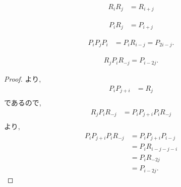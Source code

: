 \begin{lemma}
  \begin{align*}
    R_i R_j&= R_{i+j}
  \end{align*}
\end{lemma}

\begin{cor}
  \label{lem:i2m:fomula:prp}
  \begin{align*}
    P_i R_j&= P_{i+j}
  \end{align*}
\end{cor}

\begin{cor}
  \label{lem:i2m:formula:conjP}
  \begin{align*}
    P_i P_j P_i&= P_iR_{i-j}=P_{2i-j}.
  \end{align*}
\end{cor}

\begin{cor}
  \label{lem:i2m:formula:conjR}
  \begin{align*}
    R_{j}P_iR_{-j}=P_{i-2j}.
  \end{align*}
\end{cor}
\begin{proof}
  より,
  \begin{align*}
    P_{i}P_{j+i}&=R_{j}\\
  \end{align*}
であるので,
  \begin{align*}
    R_{j}P_iR_{-j}&=P_{i}P_{j+i}P_{i}R_{-j}\\
  \end{align*}
  より,
\begin{align*}
  P_{i}P_{j+i}P_{i}R_{-j}&=P_{i}P_{j+i}P_{i-j}\\
    &=P_{i}R_{i-j-j-i}\\
    &=P_{i}R_{-2j}\\
    &=P_{i-2j}.
  \end{align*}
\end{proof}

    

